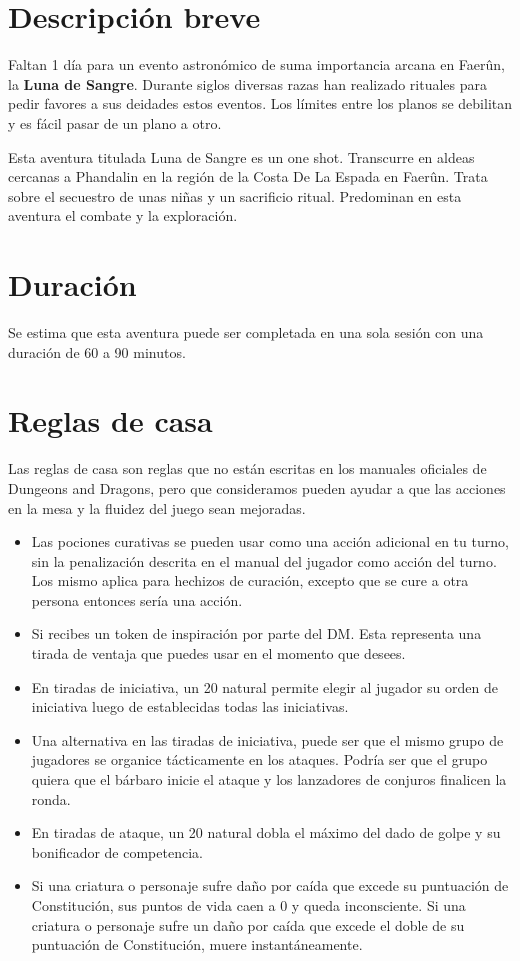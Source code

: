 \documentclass[10pt,twoside,twocolumn,openany]{dndbook}
\begin{document}
\section*{Descripción breve}

Faltan 1 día para un evento astronómico de suma importancia arcana en Faerûn, la \textbf{Luna de Sangre}. 
Durante siglos diversas razas han realizado rituales para pedir favores a sus deidades estos eventos.
Los límites entre los planos se debilitan y es fácil pasar de un plano a otro.

Esta aventura titulada Luna de Sangre es un one shot. Transcurre en aldeas cercanas a Phandalin en 
la región de la Costa De La Espada en Faerûn. Trata sobre el secuestro de unas niñas y un 
sacrificio ritual. Predominan en esta aventura el combate y la exploración.

\section*{Duración}

Se estima que esta aventura puede ser completada en una sola sesión con una duración de 60 a 90 
minutos.

\section*{Reglas de casa}

Las reglas de casa son reglas que no están escritas en los manuales oficiales de Dungeons and 
Dragons, pero que consideramos pueden ayudar a que las acciones en la mesa y la fluidez del juego 
sean mejoradas.

\begin{itemize}
  \item Las pociones curativas se pueden usar como una acción adicional en tu turno, sin la 
  penalización descrita en el manual del jugador como acción del turno. Los mismo aplica para 
  hechizos de curación, excepto que se cure a otra persona entonces sería una acción.
  \item Si recibes un token de inspiración por parte del DM. Esta representa una tirada de 
  ventaja que puedes usar en el momento que desees.
  \item En tiradas de iniciativa, un 20 natural permite elegir al jugador su orden de 
  iniciativa luego de establecidas todas las iniciativas.
  \item Una alternativa en las tiradas de iniciativa, puede ser que el mismo grupo de jugadores
  se organice tácticamente en los ataques. Podría ser que el grupo quiera que el bárbaro inicie
  el ataque y los lanzadores de conjuros finalicen la ronda.
  \item En tiradas de ataque, un 20 natural dobla el máximo del dado de golpe y su bonificador 
  de competencia.
  \item Si una criatura o personaje sufre daño por caída que excede su puntuación de Constitución, 
  sus puntos de vida caen a 0 y queda inconsciente. Si una criatura o personaje sufre un daño por 
  caída que excede el doble de su puntuación de Constitución, muere instantáneamente.
\end{itemize}
\end{document}
